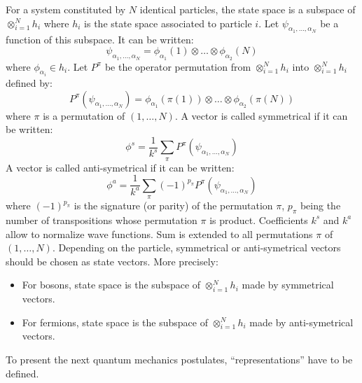 \documentclass[12pt]{book}
\begin{document}
\begin{exmp}\label{exmppauli}
For a system constituted by $N$ identical particles, the state space is a
subspace of $\otimes_{i=1}^N h_i$ where $h_i$ is the state space associated to
particle $i$.
Let $\psi_{\alpha_1,\dots,\alpha_N}$ be a function of this subspace. It can be
written:
\begin{equation}
\psi_{\alpha_1,\dots,\alpha_N} = \phi_{\alpha_1}(1)\otimes \dots
\otimes\phi_{\alpha_2}(N) 
\end{equation}
where $\phi_{\alpha_i}\in h_i$.
Let $P^{\pi}$ be the operator permutation  from
$\otimes_{i=1}^N h_i$ into
$\otimes_{i=1}^N h_i$ defined by:
\begin{equation}
P^{\pi}(\psi_{\alpha_1,\dots,\alpha_N})=
\phi_{\alpha_1}(\pi(1))\otimes \dots 
\otimes\phi_{\alpha_2}(\pi(N)) 
\end{equation}
where $\pi$ is a permutation of $(1,\dots,N)$.
A vector is called symmetrical if it can be written:
\begin{equation}
\phi^s=\frac{1}{k^s}\sum_\pi P^\pi(\psi_{\alpha_1,\dots,\alpha_N})
\end{equation}
A vector is called anti-symetrical if it can be written:
\begin{equation}
\phi^a=\frac{1}{k^a}\sum_\pi (-1)^{p_\pi}
P^\pi(\psi_{\alpha_1,\dots,\alpha_N}) 
\end{equation}
where $(-1)^{p_\pi}$ is the signature  (or parity) of the
permutation $\pi$, $p_\pi$ being the number of
transpositions whose permutation $\pi$ is product.
Coefficients $k^s$ and $k^a$ allow to normalize wave functions. Sum is
extended to all permutations $\pi$ of $(1,\dots,N)$.
Depending on the particle, symmetrical or anti-symetrical vectors should be
chosen as state vectors. More precisely:
\begin{itemize}
\item For bosons, state space is the subspace of $\otimes_{i=1}^N h_i$ made by
  symmetrical vectors.
\item For fermions, state space is the subspace of $\otimes_{i=1}^N h_i$ made
  by anti-symetrical vectors.
\end{itemize}
\end{exmp}
To present the next quantum mechanics postulates,
``representations'' \cite{ma:equad:Dautray5,ph:mecaq:Cohen73} have to be
defined. 
\end{document}
